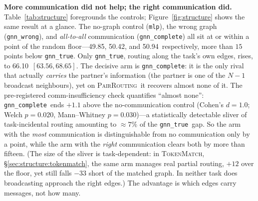 \documentclass[10pt]{article}
\newcommand{\gtrue}{\texttt{gnn\_true}}
\newcommand{\gwrong}{\texttt{gnn\_wrong}}
\newcommand{\gcomplete}{\texttt{gnn\_complete}}
\newcommand{\mlpc}{\texttt{mlp}}
\newcommand{\pairrouting}{\textsc{PairRouting}}
\newcommand{\SCtrueN}{66.10}          %
\newcommand{\SCtrueLo}{63.56}
\newcommand{\SCtrueHi}{68.65}
\newcommand{\SCwrong}{50.42}          %
\newcommand{\SCcomplete}{50.94}       %
\newcommand{\SCmlp}{49.85}            %
\newcommand{\tokenmatch}{\textsc{TokenMatch}}
\begin{document}
\textbf{More communication did not help; the right communication did.}
Table~\ref{tab:structure} foregrounds the controls; Figure~\ref{fig:structure}
shows the same result at a glance.
The no-graph control (\mlpc), the wrong graph (\gwrong), and
\emph{all-to-all} communication (\gcomplete) all sit at or within a point of
the random floor---\SCmlp, \SCwrong, and \SCcomplete\ respectively, more than
$15$ points below \gtrue. Only \gtrue,
routing along the task's own edges, rises, to \SCtrueN\ $[\SCtrueLo,
\SCtrueHi]$. The decisive arm is \gcomplete: it is the only rival that
actually \emph{carries} the partner's information (the partner is one of the
$N{-}1$ broadcast neighbours), yet on \pairrouting\ it recovers almost none of
it. The pre-registered comm-insufficiency check quantifies ``almost none'':
\gcomplete\ ends $+1.1$ above the no-communication control (Cohen's
$d{=}1.0$; Welch $p{=}0.020$, Mann--Whitney $p{=}0.030$)---a statistically
detectable sliver of task-incidental routing amounting to ${\approx}7\%$ of
the \gtrue\ gap. So the arm with the \emph{most} communication is
distinguishable from no communication only by a point, while the arm with the
\emph{right} communication clears both by more than fifteen.
(The size of the sliver is task-dependent: in \tokenmatch,
\S\ref{sec:structure:tokenmatch}, the same arm manages real partial routing,
$+12$ over the floor, yet still falls $-33$ short of the matched graph. In
neither task does broadcasting approach the right edges.) The advantage is which
edges carry messages, not how many.
\end{document}
